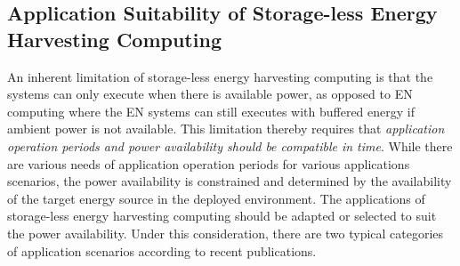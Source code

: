 \subsection{Application Suitability of Storage-less Energy Harvesting Computing}

An inherent limitation of storage-less energy harvesting computing is that the systems can only execute when there is available power, as opposed to EN computing where the EN systems can still executes with buffered energy if ambient power is not available. This limitation thereby requires that \textit{application operation periods and power availability should be compatible in time}. While there are various needs of application operation periods for various applications scenarios, the power availability is constrained and determined by the availability of the target energy source in the deployed environment. The applications of storage-less energy harvesting computing should be adapted or selected to suit the power availability. Under this consideration, there are two typical categories of application scenarios according to recent publications. 

